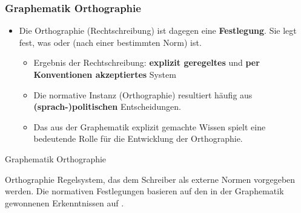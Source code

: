 \begin{frame}
\frametitle{Graphematik \vs Orthographie}

\begin{itemize}
	\item Die Orthographie (Rechtschreibung) ist dagegen eine \textbf{ Festlegung}. Sie legt fest, was \textbf{} oder \textbf{} (nach einer bestimmten Norm) ist.
	
	\begin{itemize}
		\item Ergebnis der Rechtschreibung: \textbf{explizit geregeltes} und \textbf{per Konventionen akzeptiertes} System
		
		\item Die normative Instanz (Orthographie) resultiert häufig aus \textbf{(sprach-)politischen} Entscheidungen.
		
		\item Das aus der Graphematik explizit gemachte Wissen spielt eine bedeutende Rolle für die Entwicklung der Orthographie.
	\end{itemize}
\end{itemize}

\end{frame}


\begin{frame}{Graphematik \vs Orthographie}

\begin{block}{Orthographie}
	Regelsystem, das dem Schreiber als externe Normen vorgegeben werden. Die normativen Festlegungen basieren \idR auf den in der Graphematik gewonnenen Erkenntnissen auf \citep[vgl.][141]{Duerscheid04a}.
\end{block}

\end{frame}


